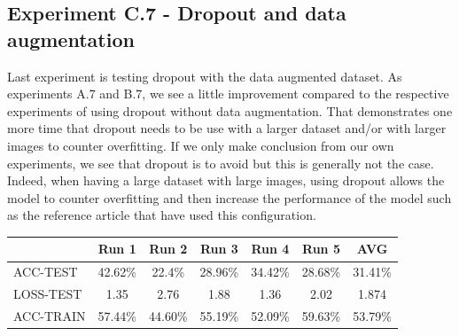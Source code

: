 \documentclass[11pt, openany]{report}
\theoremstyle{plain}
\theoremstyle{definition}
\theoremstyle{remark}
\begin{document}
\subsection{Experiment C.7 - Dropout and data augmentation}
Last experiment is testing dropout with the data augmented dataset. As experiments A.7 and B.7,  we see a little improvement compared to the respective experiments of using dropout without data augmentation. That demonstrates one more time that dropout needs to be use with a larger dataset and/or with larger images to counter overfitting. If we only make conclusion from our own experiments, we see that dropout is to avoid but this is generally not the case. Indeed, when having a large dataset with large images, using dropout allows the model to counter overfitting and then increase the performance of the model such as the reference article \cite{leukemia} that have used this configuration. 

\begin{center}
\begin{tabular}{|l|c|c|c|c|c|c|}
  \hline
   & \textbf{Run 1} & \textbf{Run 2} & \textbf{Run 3} & \textbf{Run 4} & \textbf{Run 5} & \textbf{AVG}\\
  \hline
  ACC-TEST & 42.62\% & 22.4\% & 28.96\% & 34.42\% & 28.68\% & 31.41\% \\
  LOSS-TEST & 1.35 & 2.76 & 1.88 & 1.36 & 2.02 & 1.874 \\ 
  ACC-TRAIN & 57.44\% & 44.60\% & 55.19\% & 52.09\% & 59.63\% & 53.79\% \\ 
  \hline
\end{tabular}
\label{table:results-C7}
\end{center}
\end{document}
